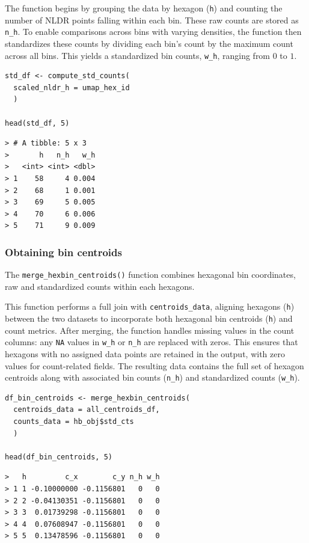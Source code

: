 The function begins by grouping the data by hexagon (\texttt{h}) and counting the number of NLDR points falling within each bin. These raw counts are stored as \texttt{n\_h}. To enable comparisons across bins with varying densities, the function then standardizes these counts by dividing each bin's count by the maximum count across all bins. This yields a standardized bin counts, \texttt{w\_h}, ranging from \(0\) to \(1\).

\begin{verbatim}
std_df <- compute_std_counts(
  scaled_nldr_h = umap_hex_id
  )

head(std_df, 5)
\end{verbatim}

\begin{verbatim}
> # A tibble: 5 x 3
>       h   n_h   w_h
>   <int> <int> <dbl>
> 1    58     4 0.004
> 2    68     1 0.001
> 3    69     5 0.005
> 4    70     6 0.006
> 5    71     9 0.009
\end{verbatim}

\subsubsection{Obtaining bin centroids}\label{obtaining-bin-centroids}

The \texttt{merge\_hexbin\_centroids()} function combines hexagonal bin coordinates, raw and standardized counts within each hexagons.

This function performs a full join with \texttt{centroids\_data}, aligning hexagons (\texttt{h}) between the two datasets to incorporate both hexagonal bin centroids (\texttt{h}) and count metrics. After merging, the function handles missing values in the count columns: any \texttt{NA} values in \texttt{w\_h} or \texttt{n\_h} are replaced with zeros. This ensures that hexagons with no assigned data points are retained in the output, with zero values for count-related fields. The resulting data contains the full set of hexagon centroids along with associated bin counts (\texttt{n\_h}) and standardized counts (\texttt{w\_h}).

\begin{verbatim}
df_bin_centroids <- merge_hexbin_centroids(
  centroids_data = all_centroids_df, 
  counts_data = hb_obj$std_cts
  )

head(df_bin_centroids, 5)
\end{verbatim}

\begin{verbatim}
>   h         c_x        c_y n_h w_h
> 1 1 -0.10000000 -0.1156801   0   0
> 2 2 -0.04130351 -0.1156801   0   0
> 3 3  0.01739298 -0.1156801   0   0
> 4 4  0.07608947 -0.1156801   0   0
> 5 5  0.13478596 -0.1156801   0   0
\end{verbatim}

